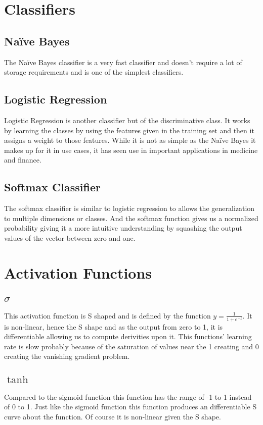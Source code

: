 \documentclass{article}
\begin{document}
\section{Classifiers}
\subsection{Na\"ive Bayes}
The Na\"ive Bayes classifier is a very fast classifier and doesn't require a lot of storage requirements and is one of the simplest classifiers.
\subsection{Logistic Regression}
Logistic Regression is another classifier but of the discriminative class. It works by learning the classes by using the features given in the training set and then it assigns a weight to those features. While it is not as simple as the Na\"ive Bayes it makes up for it in use cases, it has seen use in important applications in medicine and finance. 
\subsection{Softmax Classifier} 
The softmax classifier is similar to logistic regression to allows the generalization to multiple dimensions or classes. 
And the softmax function gives us a normalized probability giving it a more intuitive understanding by squashing the output values of the vector between zero and one. 
\section{Activation Functions}
\subsection{\(\sigma\)}
This activation function is S shaped and is defined by the function \(y= \frac{1}{1 + e^{-z}}\). 
It is non-linear, hence the S shape and as the output from zero to 1, it is differentiable allowing us to compute derivities upon it. 
This functions' learning rate is slow probably because of the saturation of values near the 1 creating and 0 creating the vanishing gradient problem. 
\subsection{\(\tanh\)}
Compared to the sigmoid function this function has the range of -1 to 1 instead of 0 to 1.
Just like the sigmoid function this function produces an differentiable S curve about the function. 
Of course it is non-linear given the S shape.
\end{document}
